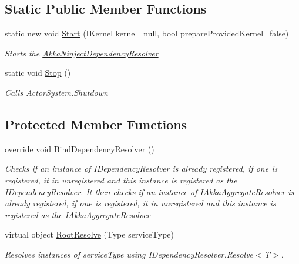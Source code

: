 \subsection*{Static Public Member Functions}
\begin{DoxyCompactItemize}
\item 
static new void \hyperlink{classCqrs_1_1Ninject_1_1Akka_1_1AkkaNinjectDependencyResolver_afedf5f178be776a0f89d7d12c63326c7_afedf5f178be776a0f89d7d12c63326c7}{Start} (I\+Kernel kernel=null, bool prepare\+Provided\+Kernel=false)
\begin{DoxyCompactList}\small\item\em Starts the \hyperlink{classCqrs_1_1Ninject_1_1Akka_1_1AkkaNinjectDependencyResolver}{Akka\+Ninject\+Dependency\+Resolver} \end{DoxyCompactList}\item 
static void \hyperlink{classCqrs_1_1Ninject_1_1Akka_1_1AkkaNinjectDependencyResolver_a605f605b38b49b8d0e00695983f85bf6_a605f605b38b49b8d0e00695983f85bf6}{Stop} ()
\begin{DoxyCompactList}\small\item\em Calls Actor\+System.\+Shutdown \end{DoxyCompactList}\end{DoxyCompactItemize}
\subsection*{Protected Member Functions}
\begin{DoxyCompactItemize}
\item 
override void \hyperlink{classCqrs_1_1Ninject_1_1Akka_1_1AkkaNinjectDependencyResolver_ab7ba3c0a331d115073b5118673984507_ab7ba3c0a331d115073b5118673984507}{Bind\+Dependency\+Resolver} ()
\begin{DoxyCompactList}\small\item\em Checks if an instance of I\+Dependency\+Resolver is already registered, if one is registered, it in unregistered and this instance is registered as the I\+Dependency\+Resolver. It then checks if an instance of I\+Akka\+Aggregate\+Resolver is already registered, if one is registered, it in unregistered and this instance is registered as the I\+Akka\+Aggregate\+Resolver \end{DoxyCompactList}\item 
virtual object \hyperlink{classCqrs_1_1Ninject_1_1Akka_1_1AkkaNinjectDependencyResolver_a01f8088b8081ccaad65c1c6be36f7b65_a01f8088b8081ccaad65c1c6be36f7b65}{Root\+Resolve} (Type service\+Type)
\begin{DoxyCompactList}\small\item\em Resolves instances of {\itshape service\+Type}  using I\+Dependency\+Resolver.\+Resolve$<$\+T$>$. \end{DoxyCompactList}\end{DoxyCompactItemize}
